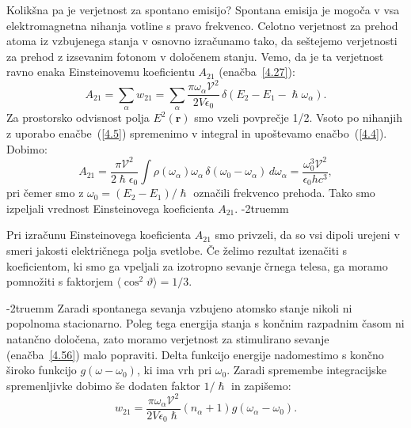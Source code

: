 Kolikšna pa je verjetnost za spontano emisijo?
Spontana emisija je mogoča v vsa elektromagnetna nihanja votline s
pravo frekvenco. Celotno verjetnost za prehod atoma iz vzbujenega stanja
v osnovno izračunamo tako, da seštejemo verjetnosti za prehod z izsevanim fotonom 
v določenem stanju. Vemo, da je ta verjetnost ravno enaka 
Einsteinovemu koeficientu $A_{21}$ (enačba~\ref{4.27}):
\begin{equation}
A_{21}=\sum_{\alpha}w_{21}=\sum_{\alpha}\frac{\pi \omega_{\alpha}\mathcal{V}^{2}}
{2V\epsilon_{0}}\,\delta(E_{2}-E_{1}-\hslash\omega_{\alpha}).
\label{4.57}
\end{equation}
Za prostorsko odvisnost polja $E^{2}(\mathbf{r})$ smo vzeli povprečje
1/2. Vsoto po nihanjih z uporabo enačbe~(\ref{4.5}) spremenimo v integral
in upoštevamo enačbo~(\ref{4.4}). Dobimo:
\begin{equation}
A_{21}=\frac{\pi \mathcal{V}^{2}}{2\hslash\epsilon_{0}}\int\rho(\omega_{\alpha})\omega_\alpha\, 
\delta(\omega_{0}-\omega_{\alpha})\, d\omega_{\alpha}=\frac{\omega_{0}^{3}\mathcal{V}^{2}}{\epsilon_{0} h c^{3}},
\label{4.58}
\end{equation}
 pri čemer smo z $\omega_{0}=(E_{2}-E_{1})/\hslash$ označili frekvenco prehoda. Tako smo 
 izpeljali vrednost Einsteinovega koeficienta $A_{21}$. 
 \vglue-2truemm
\begin{remark}
Pri izračunu Einsteinovega koeficienta $A_{21}$ smo privzeli, da so vsi dipoli urejeni  
 v smeri jakosti električnega polja svetlobe. Če želimo rezultat izenačiti s koeficientom, ki smo ga vpeljali
 za izotropno sevanje črnega telesa, ga moramo pomnožiti s faktorjem $\langle \cos^2\vartheta
 \rangle = 1/3$.
\end{remark}
\vglue-2truemm
Zaradi spontanega sevanja vzbujeno atomsko stanje nikoli ni popolnoma
stacionarno. Poleg tega energija stanja s končnim razpadnim časom ni natančno
določena, zato moramo verjetnost za stimulirano sevanje (enačba~\ref{4.56}) malo 
popraviti. Delta funkcijo energije nadomestimo s končno široko  
funkcijo $g(\omega-\omega_0)$, ki ima vrh pri $\omega_{0}$. Zaradi 
spremembe integracijske spremenljivke dobimo še dodaten faktor $1/\hslash$ in zapišemo:
\begin{equation}
w_{21}=\frac{\pi \omega_{\alpha}\mathcal{V}^{2}}{2V\epsilon_{0}\hslash}
(n_{\alpha}+1)g(\omega_{\alpha}-\omega_0).
\label{4.59}
\end{equation}

